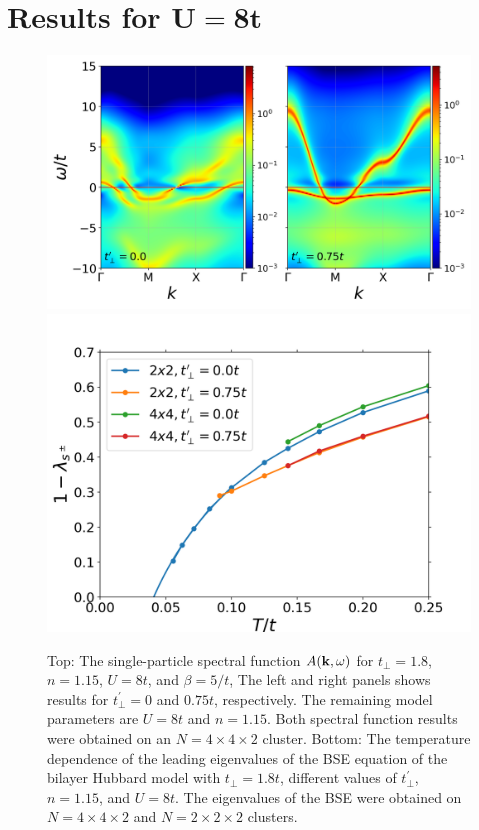\documentclass[prb,twocolumn,amsmath,amssymb,superscriptaddress,floatfix,nofootinbib]{revtex4-2}
\begin{document}
\section{Results for $\mathbf{U = 8t}$}\label{sec:appendixU8}
\begin{figure}
\centering
\includegraphics[scale=0.34]{Akw_tp1pt8_tpp0pt0_0pt75_U8.png}
\includegraphics[scale=0.4]{size_dep_U8_tp1pt8_n1pt15.png}
\caption{Top: The single-particle spectral function $A({\bf k},\omega)$ for $t_{\perp}= 1.8$, $n = 1.15$, $U = 8t$, and $\beta = 5/t$, The left and right panels shows results for $t^\prime_\perp = 0$ and $0.75t$, respectively. 
The remaining model parameters are $U=8t$ and $n=1.15$. 
Both spectral function results were obtained on an $N = 4\times 4\times 2$ cluster. 
Bottom: The temperature dependence of the leading eigenvalues of the BSE equation of the bilayer Hubbard model with $t_{\perp}=1.8t$, different values of $t_{\perp}^{\prime}$, $n = 1.15$, and $U = 8t$. The eigenvalues of the BSE were obtained on $N = 4\times 4\times 2$ and $N = 2\times 2\times 2$ clusters. 
 }
\label{fig:U8}
\end{figure}
\end{document}
